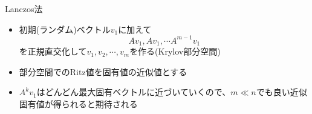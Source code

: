 \begin{frame}[t,fragile]{Lanczos法}
  \begin{itemize}
    \setlength{\itemsep}{1em}
  \item 初期(ランダム)ベクトル$v_1$に加えて
    \[
    Av_1, Av_1, \cdots A^{m-1}v_1
    \]
    を正規直交化して$v_1,v_2,\cdots,v_m$を作る(Krylov部分空間)
  \item 部分空間でのRitz値を固有値の近似値とする
  \item $A^kv_1$はどんどん最大固有ベクトルに近づいていくので、$m \ll n$でも良い近似固有値が得られると期待される
  \end{itemize}
\end{frame}
